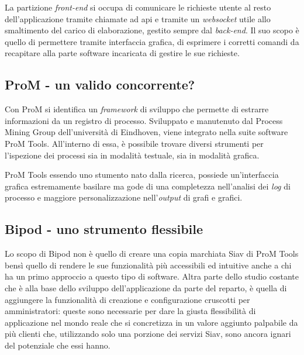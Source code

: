 La partizione \textit{front-end} si occupa di comunicare le richieste utente al resto dell'applicazione tramite chiamate ad \acrshort{api} e tramite un \textit{websocket} utile allo smaltimento del carico di elaborazione, gestito sempre dal \textit{back-end}. Il suo scopo è quello di permettere tramite interfaccia grafica, di esprimere i corretti comandi da recapitare alla parte software incaricata di gestire le sue richieste.
\newpage
\subsection{ProM - un valido concorrente?}
Con ProM si identifica un \textit{framework} di sviluppo che permette di estrarre informazioni da un registro di processo. Sviluppato e manutenuto dal Process Mining Group dell'università di Eindhoven, viene integrato nella suite software ProM Tools. All'interno di essa, è possibile trovare diversi strumenti per l'ispezione dei processi sia in modalità testuale, sia in modalità grafica.

ProM Tools essendo uno stumento nato dalla ricerca, possiede un'interfaccia grafica estremamente basilare ma gode di una completezza nell'analisi dei \textit{log} di processo e maggiore personalizzazione nell'\textit{output} di grafi e grafici.
\subsection{Bipod - uno strumento flessibile}
Lo scopo di Bipod non è quello di creare una copia marchiata Siav di ProM Tools bensì quello di rendere le sue funzionalità più accessibili ed intuitive anche a chi ha un primo approccio a questo tipo di software.
Altra parte dello studio costante che è alla base dello sviluppo dell'applicazione da parte del reparto, è quella di aggiungere la funzionalità di creazione e configurazione cruscotti per amministratori: queste sono necessarie per dare la giusta flessibilità di applicazione nel mondo reale che si concretizza in un valore aggiunto palpabile da più clienti che, utilizzando solo una porzione dei servizi Siav, sono ancora ignari del potenziale che essi hanno.

